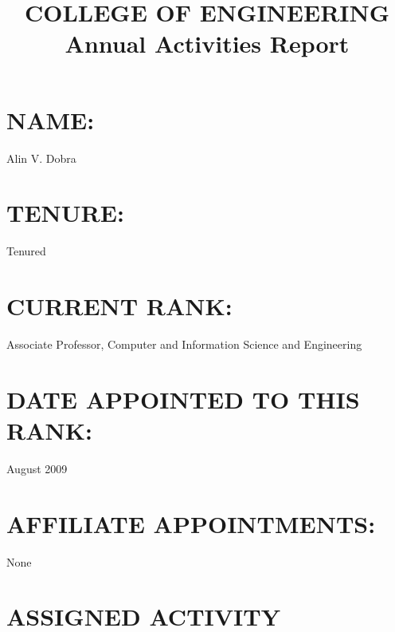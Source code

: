 \documentclass{article}
\begin{document}
\title{COLLEGE OF ENGINEERING \\ Annual Activities Report}
\date{}
\maketitle

\section{NAME:} \begin{Large}Alin V. Dobra\end{Large}

\section{TENURE:} Tenured

\section{CURRENT RANK:} Associate Professor, Computer and Information Science and Engineering

\section{DATE APPOINTED TO THIS RANK:} August 2009

\section{AFFILIATE APPOINTMENTS:} None






\section{ASSIGNED ACTIVITY}
\end{document}
